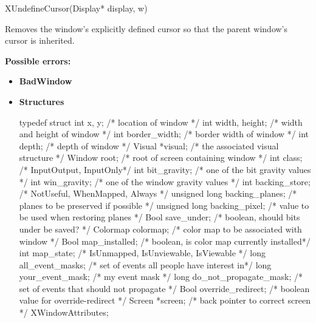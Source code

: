 \documentclass{report}
\begin{document}
\begin{itemize}
            \begin{cppcode}
                XUndefineCursor(Display* display, w)
            \end{cppcode}
            \bigbreak \noindent
            Removes the window's explicitly defined cursor so that the parent window's cursor is inherited.

            \bigbreak \noindent
            \textbf{Possible errors:}
            \begin{itemize}
                \item \textbf{BadWindow}
            \end{itemize}


    \end{itemize}

    \pagebreak 
    \begin{itemize}
        \item \textbf{Structures}
            \begin{cppcode}
                typedef struct {
                    int x, y;                           /* location of window */
                    int width, height;                  /* width and height of window */
                    int border_width;                   /* border width of window */
                    int depth;                          /* depth of window */
                    Visual *visual;                     /* the associated visual structure */
                    Window root;                        /* root of screen containing window */
                    int class;                          /* InputOutput, InputOnly*/
                    int bit_gravity;                    /* one of the bit gravity values */
                    int win_gravity;                    /* one of the window gravity values */
                    int backing_store;                  /* NotUseful, WhenMapped, Always */
                    unsigned long backing_planes;       /* planes to be preserved if possible */
                    unsigned long backing_pixel;        /* value to be used when restoring planes */
                    Bool save_under;                    /* boolean, should bits under be saved? */
                    Colormap colormap;                  /* color map to be associated with window */
                    Bool map_installed;                 /* boolean, is color map currently installed*/
                    int map_state;                      /* IsUnmapped, IsUnviewable, IsViewable */
                    long all_event_masks;               /* set of events all people have interest in*/
                    long your_event_mask;               /* my event mask */
                    long do_not_propagate_mask;         /* set of events that should not propagate */
                    Bool override_redirect;             /* boolean value for override-redirect */
                    Screen *screen;                     /* back pointer to correct screen */
                } XWindowAttributes;
            \end{cppcode}


\end{itemize}
\end{document}
